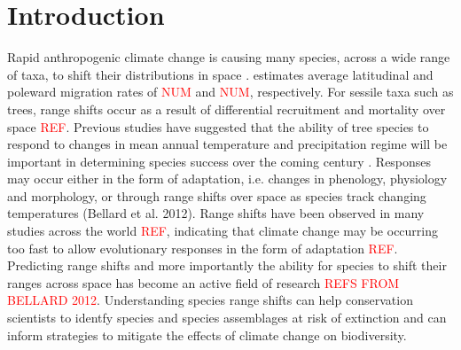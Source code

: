 \documentclass[a4paper,11pt]{article}
\newcommand{\todo}[1]{\textcolor{red}{#1}}   %
\begin{document}
\section*{Introduction}
Rapid anthropogenic climate change is causing many species, across a wide range of taxa, to shift their distributions in space \citep{Hughes2000, Parmesan2006, Chen2011}. \citet{Chen2011} estimates average latitudinal and poleward migration rates of \todo{NUM} and \todo{NUM}, respectively. For sessile taxa such as trees, range shifts occur as a result of differential recruitment and mortality over space \todo{REF}. Previous studies have suggested that the ability of tree species to respond to changes in mean annual temperature and precipitation regime will be important in determining species success over the coming century \citep{Colwell2008, Chen2011, Feeley2012}. Responses may occur either in the form of adaptation, i.e. changes in phenology, physiology and morphology, or through range shifts over space as species track changing temperatures (Bellard et al. 2012). Range shifts have been observed in many studies across the world \todo{REF}, indicating that climate change may be occurring too fast to allow evolutionary responses in the form of adaptation \todo{REF}. Predicting range shifts and more importantly the ability for species to shift their ranges across space has become an active field of research \todo{REFS FROM BELLARD 2012}. Understanding species range shifts can help conservation scientists to identfy species and species assemblages at risk of extinction and can inform strategies to mitigate the effects of climate change on biodiversity. 
\end{document}
